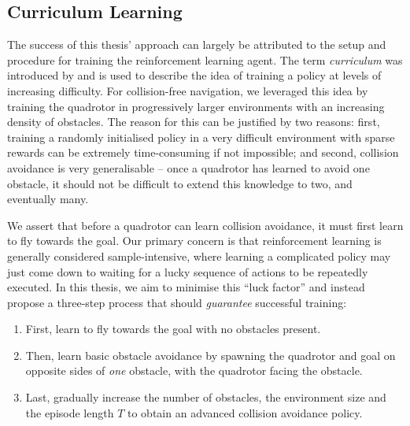 \subsection{Curriculum Learning}
\label{subsec:5_curriculum}
The success of this thesis' approach can largely be attributed to the setup and procedure for training the reinforcement learning agent.
The term \textit{curriculum} was introduced by \cite{LearningWalkMassivelyParallel} and is used to describe the idea of training a policy at levels of increasing difficulty. For collision-free navigation, we leveraged this idea by training the quadrotor in progressively larger environments with an increasing density of obstacles. The reason for this can be justified by two reasons: first, training a randomly initialised policy in a very difficult environment with sparse rewards can be extremely time-consuming if not impossible; and second, collision avoidance is very generalisable -- once a quadrotor has learned to avoid one obstacle, it should not be difficult to extend this knowledge to two, and eventually many.

We assert that before a quadrotor can learn collision avoidance, it must first learn to fly towards the goal. Our primary concern is that reinforcement learning is generally considered sample-intensive, where learning a complicated policy may just come down to waiting for a lucky sequence of actions to be repeatedly executed. In this thesis, we aim to minimise this ``luck factor'' and instead propose a three-step process that should \textit{guarantee} successful training:
\begin{enumerate}
    \item First, learn to fly towards the goal with no obstacles present. 
    \item Then, learn basic obstacle avoidance by spawning the quadrotor and goal on opposite sides of \textit{one} obstacle, with the quadrotor facing the obstacle.
    \item Last, gradually increase the number of obstacles, the environment size and the episode length $T$ to obtain an advanced collision avoidance policy.
\end{enumerate}


